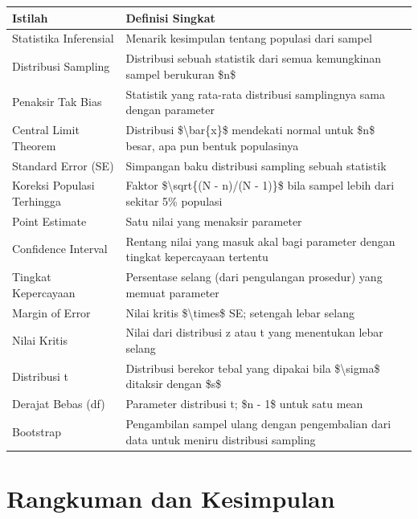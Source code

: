 \documentclass[
  indonesian,
  letterpaper,
]{book}
\begin{document}
\begin{longtable*}[t]{ll}
\toprule
Istilah & Definisi Singkat\\
\midrule
Statistika Inferensial & Menarik kesimpulan tentang populasi dari sampel\\
Distribusi Sampling & Distribusi sebuah statistik dari semua kemungkinan sampel berukuran \$n\$\\
Penaksir Tak Bias & Statistik yang rata-rata distribusi samplingnya sama dengan parameter\\
Central Limit Theorem & Distribusi \$\textbackslash{}bar\{x\}\$ mendekati normal untuk \$n\$ besar, apa pun bentuk populasinya\\
Standard Error (SE) & Simpangan baku distribusi sampling sebuah statistik\\
\addlinespace
Koreksi Populasi Terhingga & Faktor \$\textbackslash{}sqrt\{(N - n)/(N - 1)\}\$ bila sampel lebih dari sekitar 5\% populasi\\
Point Estimate & Satu nilai yang menaksir parameter\\
Confidence Interval & Rentang nilai yang masuk akal bagi parameter dengan tingkat kepercayaan tertentu\\
Tingkat Kepercayaan & Persentase selang (dari pengulangan prosedur) yang memuat parameter\\
Margin of Error & Nilai kritis \$\textbackslash{}times\$ SE; setengah lebar selang\\
\addlinespace
Nilai Kritis & Nilai dari distribusi z atau t yang menentukan lebar selang\\
Distribusi t & Distribusi berekor tebal yang dipakai bila \$\textbackslash{}sigma\$ ditaksir dengan \$s\$\\
Derajat Bebas (df) & Parameter distribusi t; \$n - 1\$ untuk satu mean\\
Bootstrap & Pengambilan sampel ulang dengan pengembalian dari data untuk meniru distribusi sampling\\
\bottomrule
\end{longtable*}
\endgroup{}


\chapter{Rangkuman dan Kesimpulan}\label{rangkuman-dan-kesimpulan}
\end{document}
